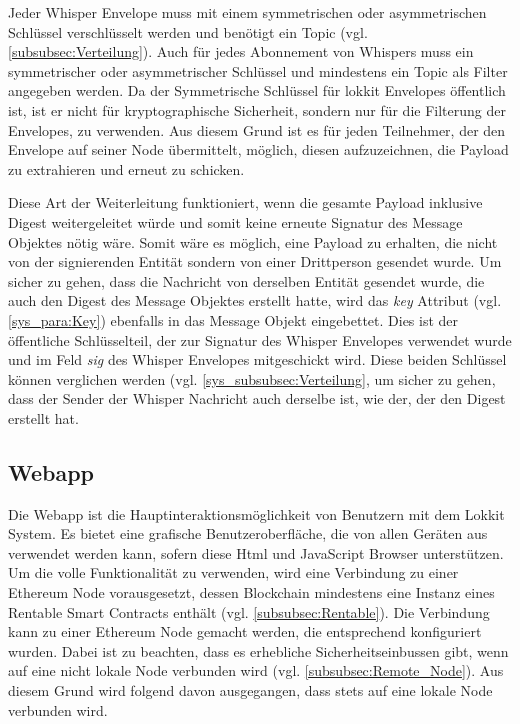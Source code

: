 Jeder Whisper Envelope muss mit einem symmetrischen oder asymmetrischen Schlüssel verschlüsselt werden und benötigt ein Topic (vgl. \ref{subsubsec:Verteilung}).
Auch für jedes Abonnement von Whispers muss ein symmetrischer oder asymmetrischer Schlüssel und mindestens ein Topic als Filter angegeben werden. Da der Symmetrische Schlüssel für lokkit Envelopes öffentlich ist, ist er nicht für kryptographische Sicherheit, sondern nur für die Filterung der Envelopes, zu verwenden. Aus diesem Grund ist es für jeden Teilnehmer, der den Envelope auf seiner Node übermittelt, möglich, diesen aufzuzeichnen, die Payload zu extrahieren und erneut zu schicken.\cite{replay_attack_on_security_protocols}

Diese Art der Weiterleitung funktioniert, wenn die gesamte Payload inklusive Digest weitergeleitet würde und somit keine erneute Signatur des Message Objektes nötig wäre. Somit wäre es möglich, eine Payload zu erhalten, die nicht von der signierenden Entität sondern von einer Drittperson gesendet wurde. Um sicher zu gehen, dass die Nachricht von derselben Entität gesendet wurde, die auch den Digest des Message Objektes erstellt hatte, wird das \emph{key} Attribut (vgl. \ref{sys_para:Key}) ebenfalls in das Message Objekt eingebettet. Dies ist der öffentliche Schlüsselteil, der zur Signatur des Whisper Envelopes verwendet wurde und im Feld \emph{sig} des Whisper Envelopes mitgeschickt wird. Diese beiden Schlüssel können verglichen werden (vgl. \ref{sys_subsubsec:Verteilung}, um sicher zu gehen, dass der Sender der Whisper Nachricht auch derselbe ist, wie der, der den Digest erstellt hat.

\subsection{Webapp}
\label{subsec:Webapp}
Die Webapp ist die Hauptinteraktionsmöglichkeit von Benutzern mit dem Lokkit System. Es bietet eine grafische Benutzeroberfläche, die von allen Geräten aus verwendet werden kann, sofern diese Html und JavaScript Browser unterstützen. Um die volle Funktionalität zu verwenden, wird eine Verbindung zu einer Ethereum Node vorausgesetzt, dessen Blockchain mindestens eine Instanz eines Rentable Smart Contracts enthält (vgl. \ref{subsubsec:Rentable}). Die Verbindung kann zu einer Ethereum Node gemacht werden, die entsprechend konfiguriert wurden. Dabei ist zu beachten, dass es erhebliche Sicherheitseinbussen gibt, wenn auf eine nicht lokale Node verbunden wird (vgl. \ref{subsubsec:Remote_Node}). Aus diesem Grund wird folgend davon ausgegangen, dass stets auf eine lokale Node verbunden wird.

